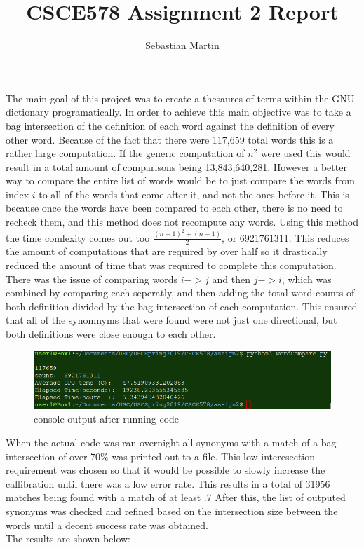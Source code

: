 \documentclass{article}
\title{
CSCE578 Assignment 2 Report
}
\author{Sebastian Martin}
\begin{document}
\maketitle


\begin{addmargin}[4em]{4em}
The main goal of this project was to create a thesaures of terms within the GNU dictionary programatically. In order to achieve this main objective was to take a bag intersection of the definition of each word against the definition of every other word. Because of the fact that there were 117,659 total words this is a rather large computation. If the generic computation of $n^2$ were used this would result in a total amount of comparisons being 13,843,640,281. However a better way to compare the entire list of words would be to just compare the words from index $i$ to all of the words that come after it, and not the ones before it. This is because once the words have been compared to each other, there is no need to recheck them, and this method does not recompute any words. Using this method the time comlexity comes out too $\frac{(n-1)^2 + (n-1)}{2}$, or 6921761311. This reduces the amount of computations that are required by over half so it drastically reduced the amount of time that was required to complete this computation. There was the issue of comparing words $i -> j$ and then $j-> i$, which was combined by comparing each seperatly, and then adding the total word counts of both definition divided by the bag intersection of each computation. This ensured that all of the synomnyms that were found were not just one directional, but both definitions were close enough to each other.\\
\begin{figure}[!hb]
  \includegraphics[width=\linewidth]{download.png}
  \caption{console output after running code}
\end{figure}
\par When the actual code was ran overnight all synonyms with a match of a bag intersection of over $70\%$ was printed out to a file. This low interesection requirement was chosen so that it would be possible to slowly increase the callibration until there was a low error rate. This results in a total of 31956 matches being found with a match of at least .7  After this, the list of outputed synonyms was checked and refined based on the intersection size between the words until a decent success rate was obtained. \\The results are shown below:

\end{addmargin}
\end{document}
